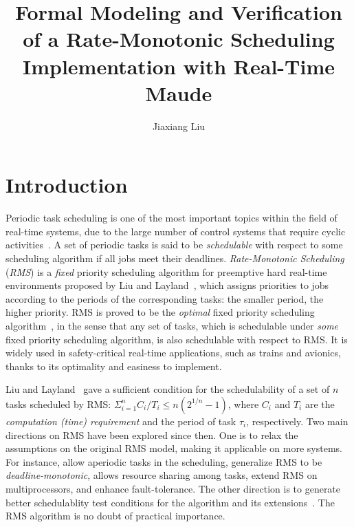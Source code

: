 \documentclass{llncs}
\begin{document}

\title{Formal Modeling and Verification of a Rate-Monotonic Scheduling Implementation with Real-Time Maude}
\author{Jiaxiang Liu}
\maketitle
\thispagestyle{empty}

\section{Introduction}
Periodic task scheduling is one of the most important topics within
the field of real-time systems, due to the large number of control
systems that require cyclic activities~\cite{buttazzo2011hard}. A set
of periodic tasks is said to be \emph{schedulable} with respect to
some scheduling algorithm if all jobs meet their
deadlines. \emph{Rate-Monotonic Scheduling} (\emph{RMS}) is a
\emph{fixed} priority scheduling algorithm for preemptive hard
real-time environments proposed by Liu and
Layland~\cite{DBLP:journals/jacm/LiuL73}, which assigns priorities to
jobs according to the periods of the corresponding tasks: the smaller
period, the higher priority. RMS is proved to be the \emph{optimal}
fixed priority scheduling algorithm~\cite{DBLP:journals/jacm/LiuL73},
in the sense that any set of tasks, which is schedulable under
\emph{some} fixed priority scheduling algorithm, is also schedulable
with respect to RMS. It is widely used in safety-critical real-time
applications, such as trains and avionics, thanks to its optimality
and easiness to implement.

Liu and Layland~\cite{DBLP:journals/jacm/LiuL73} gave a sufficient
condition for the schedulability of a set of $n$ tasks scheduled by
RMS: $\displaystyle\Sigma^n_{i=1}C_i/T_i \le n(2^{1/n}-1)$, where
$C_i$ and $T_i$ are the \emph{computation (time) requirement} and the
period of task $\tau_i$, respectively. Two main directions on RMS have
been explored since then. One is to relax the assumptions on the
original RMS model, making it applicable on more systems.  For
instance,
\cite{DBLP:conf/rtss/LehoczkySS87,DBLP:journals/rts/SpruntSL89,DBLP:conf/rtss/LehoczkyR92,DBLP:journals/tc/StrosniderLS95}
allow aperiodic tasks in the scheduling,
\cite{DBLP:journals/pe/LeungW82,audsley1993deadline} generalize RMS to
be \emph{deadline-monotonic}, \cite{DBLP:journals/tc/ShaRL90} allows
resource sharing among tasks,
\cite{dhall1978real,DBLP:journals/rts/LopezGDG03,DBLP:journals/tpds/LopezDG04,DBLP:journals/tc/BaruahG03}
extend RMS on multiprocessors, and
\cite{DBLP:journals/rts/OhS94,DBLP:journals/rts/GhoshMMS98,DBLP:journals/tpds/BertossiMR99}
enhance fault-tolerance. The other direction is to generate better
schedulablity test conditions for the algorithm and its
extensions~\cite{DBLP:conf/rtss/LehoczkySD89,DBLP:conf/rtss/KuoM91,DBLP:journals/tc/BiniBB03,DBLP:journals/rts/LopezGDG03,DBLP:journals/tc/BaruahG03,gardner1999}. The
RMS algorithm is no doubt of practical importance.
\end{document}
